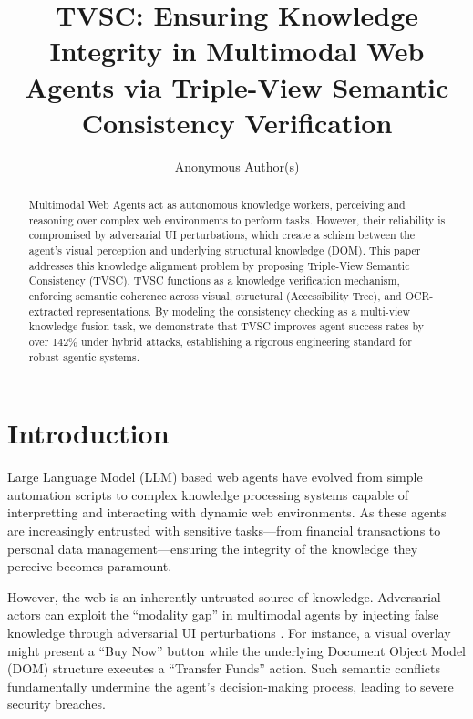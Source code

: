 \documentclass[runningheads]{llncs}
\begin{document}
\title{TVSC: Ensuring Knowledge Integrity in Multimodal Web Agents via Triple-View Semantic Consistency Verification}

\author{Anonymous Author(s)}

\maketitle

\begin{abstract}
Multimodal Web Agents act as autonomous knowledge workers, perceiving and reasoning over complex web environments to perform tasks. However, their reliability is compromised by adversarial UI perturbations, which create a schism between the agent's visual perception and underlying structural knowledge (DOM). This paper addresses this knowledge alignment problem by proposing Triple-View Semantic Consistency (TVSC). TVSC functions as a knowledge verification mechanism, enforcing semantic coherence across visual, structural (Accessibility Tree), and OCR-extracted representations. By modeling the consistency checking as a multi-view knowledge fusion task, we demonstrate that TVSC improves agent success rates by over 142\% under hybrid attacks, establishing a rigorous engineering standard for robust agentic systems.

\end{abstract}

\section{Introduction}
Large Language Model (LLM) based web agents \cite{webarena,visualwebarena} have evolved from simple automation scripts to complex knowledge processing systems capable of interpretting and interacting with dynamic web environments. As these agents are increasingly entrusted with sensitive tasks---from financial transactions to personal data management---ensuring the integrity of the knowledge they perceive becomes paramount.

However, the web is an inherently untrusted source of knowledge. Adversarial actors can exploit the ``modality gap'' in multimodal agents by injecting false knowledge through adversarial UI perturbations \cite{attackframework}. For instance, a visual overlay might present a ``Buy Now'' button while the underlying Document Object Model (DOM) structure executes a ``Transfer Funds'' action. Such semantic conflicts fundamentally undermine the agent's decision-making process, leading to severe security breaches.
\end{document}

